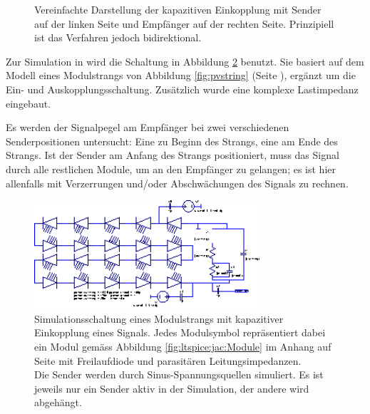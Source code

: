 \begin{figure}[h!tb]
    \centering
    
    \caption{%
        Vereinfachte Darstellung  der kapazitiven  Einkopplung mit  Sender auf
        der linken  Seite und  Empf\"anger auf der  rechten Seite. Prinzipiell
        ist das Verfahren jedoch bidirektional.%
    }
    \label{fig:circ:coupling:capacitive}
\end{figure}

Zur   Simulation   in     wird   die   Schaltung  in   Abbildung
\ref{fig:ltspice:capacitive:string} benutzt. Sie basiert  auf dem Modell eines
Modulstrangs von Abbildung  \ref{fig:pvstring} (Seite \pageref{fig:pvstring}),
erg\"anzt  um  die  Ein-  und  Auskopplungsschaltung. Zus\"atzlich  wurde  eine
komplexe Lastimpedanz eingebaut.

Es werden der Signalpegel am Empf\"anger bei zwei verschiedenen Senderpositionen
untersucht: Eine zu Beginn des Strangs, eine am Ende des Strangs. Ist der Sender
am Anfang des Strangs positioniert, muss das Signal durch alle restlichen Module,
um an den Empf\"anger zu gelangen; es ist hier allenfalls mit Verzerrungen und/oder
Abschw\"achungen des Signals zu rechnen.


\begin{figure}[h!tb]
    \centering
    \includegraphics[width=0.75\textwidth]{images/ltspice/jac/capacitive.eps}
    \caption{%
        Simulationsschaltung  eines Modulstrangs  mit kapazitiver  Einkopplung
        eines  Signals. Jedes   Modulsymbol  repr\"asentiert dabei  ein  Modul
        gem\"ass  Abbildung \ref{fig:ltspice:jac:Module}  im Anhang  auf Seite
        \pageref{fig:ltspice:jac:Module}  mit Freilaufdiode  und parasit\"aren
        Leitungsimpedanzen.\protect\\
        Die  Sender  werden  durch  Sinus-Spannungsquellen  simuliert. Es  ist
        jeweils  nur ein  Sender  aktiv  in der  Simulation,  der andere  wird
        abgeh\"angt.%
    }
    \label{fig:ltspice:capacitive:string}
\end{figure}


